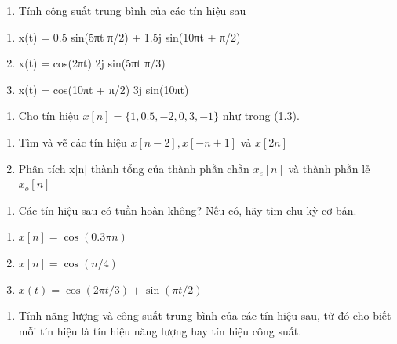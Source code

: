 \documentclass[
  10
]{article}
\providecommand{\tightlist}{%
  \setlength{\itemsep}{0pt}\setlength{\parskip}{0pt}}
\begin{document}
\begin{enumerate}
\def\labelenumi{\arabic{enumi}.}
\setcounter{enumi}{1}
\tightlist
\item
  Tính công suất trung bình của các tín hiệu sau
\end{enumerate}

\begin{enumerate}
\def\labelenumi{(\alph{enumi})}
\item
  x(t) = 0.5 sin(5πt π/2) + 1.5j sin(10πt + π/2)
\item
  x(t) = cos(2πt) 2j sin(5πt π/3)
\item
  x(t) = cos(10πt + π/2) 3j sin(10πt)
\end{enumerate}

\begin{enumerate}
\def\labelenumi{\arabic{enumi}.}
\setcounter{enumi}{2}
\tightlist
\item
  Cho tín hiệu \(x [ n ] = \{ 1 , 0 . 5 , - 2 , 0 , 3 , - 1 \}\) như
  trong (1.3).
\end{enumerate}

\begin{enumerate}
\def\labelenumi{(\alph{enumi})}
\item
  Tìm và vẽ các tín hiệu \(x [ n - 2 ] , x [ - n + 1 ]\) và
  \(x [ 2 n ]\)
\item
  Phân tích x{[}n{]} thành tổng của thành phần chẵn \(x _ { e } [ n ]\)
  và thành phần lẻ \(x _ { o } [ n ]\)
\end{enumerate}

\begin{enumerate}
\def\labelenumi{\arabic{enumi}.}
\setcounter{enumi}{3}
\tightlist
\item
  Các tín hiệu sau có tuần hoàn không? Nếu có, hãy tìm chu kỳ cơ bản.
\end{enumerate}

\begin{enumerate}
\def\labelenumi{(\alph{enumi})}
\item
  \(x [ n ] = \cos ( 0 . 3 \pi n )\)
\item
  \(x [ n ] = \cos ( n / 4 )\)
\item
  \(x ( t ) = \cos ( 2 \pi t / 3 ) + \sin ( \pi t / 2 )\)
\end{enumerate}

\begin{enumerate}
\def\labelenumi{\arabic{enumi}.}
\setcounter{enumi}{4}
\tightlist
\item
  Tính năng lượng và công suất trung bình của các tín hiệu sau, từ đó
  cho biết mỗi tín hiệu là tín hiệu năng lượng hay tín hiệu công suất.
\end{enumerate}
\end{document}
